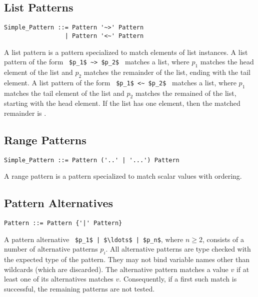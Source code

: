 \subsection{List Patterns}
\label{sec:list-patterns}

\syntax\begin{lstlisting}
Simple_Pattern ::= Pattern '~>' Pattern
                 | Pattern '<~' Pattern
\end{lstlisting}

A list pattern is a pattern specialized to match elements of list instances. A list pattern of the form ~\lstinline!$p_1$ ~> $p_2$!~ matches a list, where $p_1$ matches the head element of the list and $p_2$ matches the remainder of the list, ending with the tail element. A list pattern of the form ~\lstinline!$p_1$ <~ $p_2$!~ matches a list, where $p_1$ matches the tail element of the list and $p_2$ matches the remained of the list, starting with the head element. If the list has one element, then the matched remainder is . 





\subsection{Range Patterns}
\label{sec:range-patterns}

\syntax\begin{lstlisting}
Simple_Pattern ::= Pattern ('..' | '...') Pattern
\end{lstlisting}

A range pattern is a pattern specialized to match scalar values with ordering.






\subsection{Pattern Alternatives}
\label{sec:pattern-alternatives}

\syntax\begin{lstlisting}
Pattern ::= Pattern {'|' Pattern}
\end{lstlisting}

A pattern alternative ~\lstinline!$p_1$ | $\ldots$ | $p_n$!, where $n \geq 2$, consists of a number of alternative patterns $p_i$. All alternative patterns are type checked with the expected type of the pattern. They may not bind variable names other than wildcards (which are discarded). The alternative pattern matches a value $v$ if at least one of its alternatives matches $v$. Consequently, if a first such match is successful, the remaining patterns are not tested.

